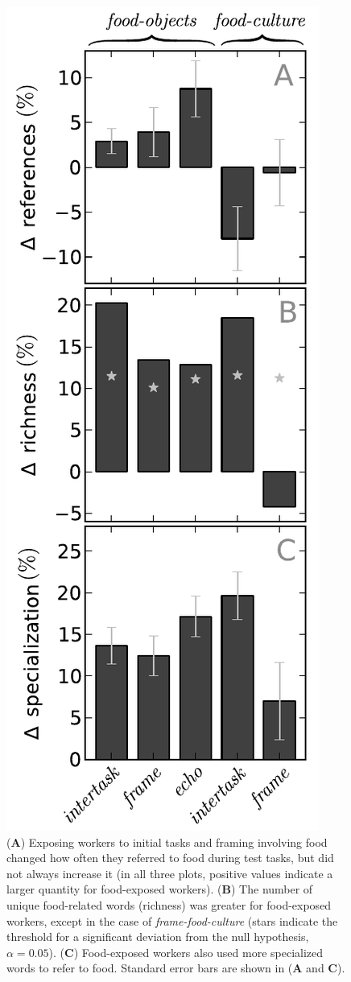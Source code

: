 \documentclass[12pt]{article}
\begin{document}
\begin{figure}
	\centering
	\includegraphics[scale=0.94]{figs/vocab_specificity.pdf}
	\caption{
		(\textbf{A}) Exposing workers to initial tasks and framing 
		involving food changed how often they referred to food 
		during test tasks, but did not always increase it (in all three plots,
		positive values indicate a larger quantity for food-exposed workers).
		(\textbf{B}) The number of unique food-related
		words (richness) was greater for food-exposed workers, except in the 
		case of \textit{frame-food-culture} (stars indicate the threshold
		for a significant deviation from the null hypothesis, $\alpha=0.05$). 
		(\textbf{C}) Food-exposed
		workers also used more specialized words to refer to food.
		Standard error bars are shown in (\textbf{A} and \textbf{C}).
	}
	\label{fig:specificity}
\end{figure}
\end{document}
